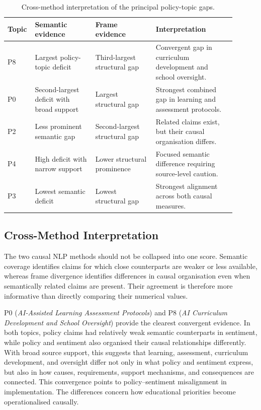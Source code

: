 \begin{table}[!htbp]
\centering
\small
\setlength{\tabcolsep}{4pt}
\begin{tabular}{
>{\centering\arraybackslash}p{0.07\linewidth}
>{\raggedright\arraybackslash}p{0.25\linewidth}
>{\raggedright\arraybackslash}p{0.25\linewidth}
>{\raggedright\arraybackslash}p{0.33\linewidth}}
\hline
Topic & Semantic evidence & Frame evidence & Interpretation \\
\hline
P8 & Largest policy-topic deficit & Third-largest structural gap &
Convergent gap in curriculum development and school oversight. \\

P0 & Second-largest deficit with broad support & Largest structural gap &
Strongest combined gap in learning and assessment protocols. \\

P2 & Less prominent semantic gap & Second-largest structural gap &
Related claims exist, but their causal organisation differs. \\

P4 & High deficit with narrow support & Lower structural prominence &
Focused semantic difference requiring source-level caution. \\

P3 & Lowest semantic deficit & Lowest structural gap &
Strongest alignment across both causal measures. \\
\hline
\end{tabular}
\caption{Cross-method interpretation of the principal policy-topic gaps.}
\label{tab:analysis-causal-synthesis}
\end{table}

\subsection{Cross-Method Interpretation}


The two causal NLP methods should not be collapsed into one score. Semantic coverage
identifies claims for which close counterparts are weaker or less available, whereas
frame divergence identifies differences in causal organisation even when semantically
related claims are present. Their agreement is therefore more informative than
directly comparing their numerical values.

P0 (\textit{AI-Assisted Learning Assessment Protocols}) and P8 (\textit{AI Curriculum
Development and School Oversight}) provide the clearest convergent evidence. In both
topics, policy claims had relatively weak semantic counterparts in sentiment, while
policy and sentiment also organised their causal relationships differently. With
broad source support, this suggests that learning, assessment, curriculum
development, and oversight differ not only in what policy and sentiment express, but
also in how causes, requirements, support mechanisms, and consequences are connected.
This convergence points to policy--sentiment misalignment in implementation.
The differences concern how educational priorities become operationalised causally.

